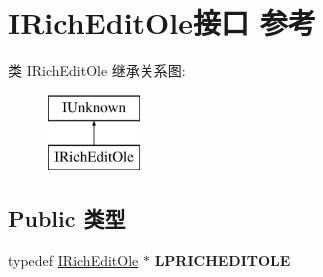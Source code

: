 \hypertarget{interface_i_rich_edit_ole}{}\section{I\+Rich\+Edit\+Ole接口 参考}
\label{interface_i_rich_edit_ole}
类 I\+Rich\+Edit\+Ole 继承关系图\+:\begin{figure}[H]
\begin{center}
\leavevmode
\includegraphics[height=2.000000cm]{interface_i_rich_edit_ole}
\end{center}
\end{figure}
\subsection*{Public 类型}
\begin{DoxyCompactItemize}
\item 
\mbox{\label{interface_i_rich_edit_ole_a9d0bc2f67c77f1ae4cc3857282ff1c1a}} 
typedef \hyperlink{interface_i_rich_edit_ole}{I\+Rich\+Edit\+Ole} $\ast$ {\bfseries L\+P\+R\+I\+C\+H\+E\+D\+I\+T\+O\+LE}
\end{DoxyCompactItemize}
